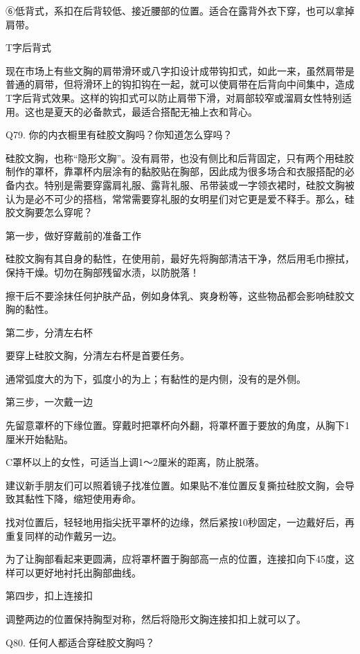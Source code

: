 \documentclass[12pt,UTF8]{ctexbook}
\begin{document}
⑥低背式，系扣在后背较低、接近腰部的位置。适合在露背外衣下穿，也可以拿掉肩带。



T字后背式

现在市场上有些文胸的肩带滑环或八字扣设计成带钩扣式，如此一来，虽然肩带是普通的肩带，但将滑环上的钩扣钩在一起，就可以使肩带在后背向中间集中，造成T字后背式效果。这样的钩扣式可以防止肩带下滑，对肩部较窄或溜肩女性特别适用。这也是夏天的必备款式，最适合搭配无袖上衣和背心。





Q79. 你的内衣橱里有硅胶文胸吗？你知道怎么穿吗？


硅胶文胸，也称“隐形文胸”。没有肩带，也没有侧比和后背固定，只有两个用硅胶制作的罩杯，靠罩杯内层涂有的黏胶贴在胸部，因此成为很多场合和衣服搭配的必备内衣。特别是需要穿露肩礼服、露背礼服、吊带装或一字领衣裙时，硅胶文胸被认为是必不可少的搭档，常常需要穿礼服的女明星们对它更是爱不释手。那么，硅胶文胸要怎么穿呢？

第一步，做好穿戴前的准备工作

硅胶文胸有其自身的黏性，在使用前，最好先将胸部清洁干净，然后用毛巾擦拭，保持干燥。切勿在胸部残留水渍，以防脱落！

擦干后不要涂抹任何护肤产品，例如身体乳、爽身粉等，这些物品都会影响硅胶文胸的黏性。

第二步，分清左右杯

要穿上硅胶文胸，分清左右杯是首要任务。

通常弧度大的为下，弧度小的为上；有黏性的是内侧，没有的是外侧。

第三步，一次戴一边

先留意罩杯的下缘位置。穿戴时把罩杯向外翻，将罩杯置于要放的角度，从胸下1厘米开始黏贴。

C罩杯以上的女性，可适当上调1～2厘米的距离，防止脱落。

建议新手朋友们可以照着镜子找准位置。如果贴不准位置反复撕拉硅胶文胸，会导致其黏性下降，缩短使用寿命。

找对位置后，轻轻地用指尖抚平罩杯的边缘，然后紧按10秒固定，一边戴好后，再重复同样的动作戴另一边。

为了让胸部看起来更圆满，应将罩杯置于胸部高一点的位置，连接扣向下45度，这样可以更好地衬托出胸部曲线。

第四步，扣上连接扣

调整两边的位置保持胸型对称，然后将隐形文胸连接扣扣上就可以了。





Q80. 任何人都适合穿硅胶文胸吗？
\end{document}
